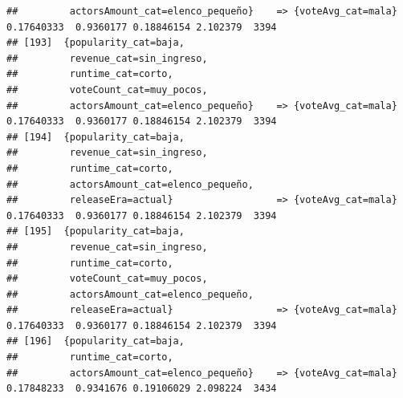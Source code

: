 \documentclass[
]{article}
\begin{document}
\begin{verbatim}
##         actorsAmount_cat=elenco_pequeño}    => {voteAvg_cat=mala}                0.17640333  0.9360177 0.18846154 2.102379  3394
## [193]  {popularity_cat=baja,                                                                                                    
##         revenue_cat=sin_ingreso,                                                                                                
##         runtime_cat=corto,                                                                                                      
##         voteCount_cat=muy_pocos,                                                                                                
##         actorsAmount_cat=elenco_pequeño}    => {voteAvg_cat=mala}                0.17640333  0.9360177 0.18846154 2.102379  3394
## [194]  {popularity_cat=baja,                                                                                                    
##         revenue_cat=sin_ingreso,                                                                                                
##         runtime_cat=corto,                                                                                                      
##         actorsAmount_cat=elenco_pequeño,                                                                                        
##         releaseEra=actual}                  => {voteAvg_cat=mala}                0.17640333  0.9360177 0.18846154 2.102379  3394
## [195]  {popularity_cat=baja,                                                                                                    
##         revenue_cat=sin_ingreso,                                                                                                
##         runtime_cat=corto,                                                                                                      
##         voteCount_cat=muy_pocos,                                                                                                
##         actorsAmount_cat=elenco_pequeño,                                                                                        
##         releaseEra=actual}                  => {voteAvg_cat=mala}                0.17640333  0.9360177 0.18846154 2.102379  3394
## [196]  {popularity_cat=baja,                                                                                                    
##         runtime_cat=corto,                                                                                                      
##         actorsAmount_cat=elenco_pequeño}    => {voteAvg_cat=mala}                0.17848233  0.9341676 0.19106029 2.098224  3434

\end{verbatim}
\end{document}
